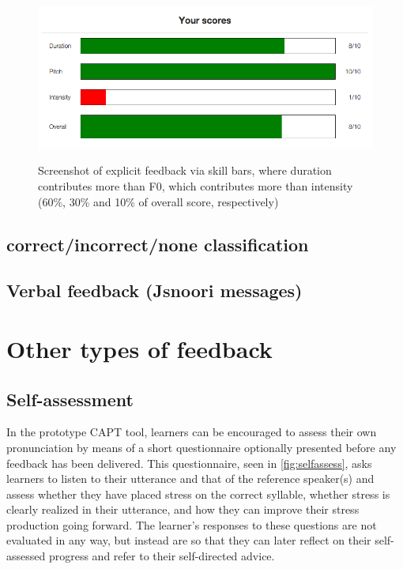 			\begin{figure}
			\centering
			\caption[Skill bars with unequal skill weights]{Screenshot of explicit feedback via skill bars, where duration contributes more than F0, which contributes more than intensity (60\%, 30\% and 10\% of overall score, respectively) }
			\includegraphics[width=\textwidth]{img/screenshots/skillBars-durPriority}
			\label{fig:skillbars:durpriority}
			\end{figure}	
		
		\subsection{correct/incorrect/none classification}
		\subsection{Verbal feedback (Jsnoori messages)}
		
	\section{Other types of feedback}
	\label{sec:fb:other}
	
		\subsection{Self-assessment}
		\label{sec:other:selfassess}
		
 
 	
 	In the prototype CAPT tool, learners can be encouraged to assess their own pronunciation by means of a short questionnaire optionally presented before any feedback has been delivered. This questionnaire, seen in \cref{fig:selfassess}, asks learners to listen to their utterance and that of the reference speaker(s) and assess whether they have placed stress on the correct syllable, whether stress is clearly realized in their utterance, and how they can improve their stress production going forward. The learner's responses to these questions are not evaluated in any way, but instead are  so that they can later reflect on their self-assessed progress and refer to their self-directed advice. 
 	
